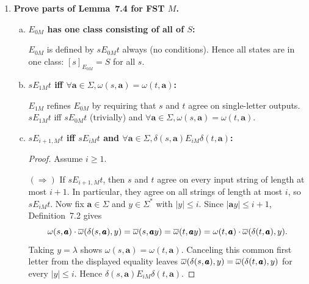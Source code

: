 \begin{enumerate}[{7.}1.]
\begin{enumerate}[(a)]
  \item \textbf{Part (e):} If $E_{mM}=E_{m+1,M}$, then $E_{mM}=E_M$.

  \begin{proof}
  By part~(b), $E_M\subseteq E_{mM}$.  For the reverse inclusion, let
  $s E_{mM} t$ and let $x\in\Sigma^*$ be arbitrary, say $|x|=k$.  By part~(c),
  \[
    E_{m+k,M}=E_{mM},
  \]
  so $s E_{m+k,M} t$.  By definition of $E_{m+k,M}$, the states $s$ and $t$
  agree on every input string of length at most $m+k$, and in particular on the
  string $x$.  Thus $\OBAR(s,x)=\OBAR(t,x)$.  Since $x$ was arbitrary, $s E_M t$.
  Hence $E_{mM}\subseteq E_M$, and therefore $E_{mM}=E_M$. \qed
  \end{proof}
\end{enumerate}

\item \textbf{Prove parts of Lemma~7.4 for FST $M$.}

\begin{enumerate}[(a)]
  \item \textbf{$E_{0M}$ has one class consisting of all of $S$:}

  $E_{0M}$ is defined by $s E_{0M} t$ always (no conditions).  Hence all states are in one class: $[s]_{E_{0M}}=S$ for all $s$.

  \item \textbf{$s E_{1M} t$ iff $\forall\pmb{a}\in\Sigma,\omega(s,\pmb{a})=\omega(t,\pmb{a})$:}

  $E_{1M}$ refines $E_{0M}$ by requiring that $s$ and $t$ agree on single-letter outputs.  $s E_{1M} t$ iff $s E_{0M} t$ (trivially) and $\forall\pmb{a}\in\Sigma,\omega(s,\pmb{a})=\omega(t,\pmb{a})$.

  \item \textbf{$s E_{i+1,M} t$ iff $s E_{iM} t$ and $\forall\pmb{a}\in\Sigma,\delta(s,\pmb{a}) E_{iM} \delta(t,\pmb{a})$:}

  \begin{proof}
  Assume $i\ge 1$.

  $(\Rightarrow)$ If $s E_{i+1,M} t$, then $s$ and $t$ agree on every input
  string of length at most $i+1$.  In particular, they agree on all strings of
  length at most $i$, so $s E_{iM} t$.  Now fix $\pmb{a}\in\Sigma$ and
  $y\in\Sigma^*$ with $|y|\le i$.  Since $|\pmb{a}y|\le i+1$, Definition~7.2
  gives
  \[
  \omega(s,\pmb{a})\cdot\overline{\omega}(\delta(s,\pmb{a}),y)
  =\overline{\omega}(s,\pmb{a}y)
  =\overline{\omega}(t,\pmb{a}y)
  =\omega(t,\pmb{a})\cdot\overline{\omega}(\delta(t,\pmb{a}),y).
  \]
  Taking $y=\lambda$ shows $\omega(s,\pmb{a})=\omega(t,\pmb{a})$.  Canceling
  this common first letter from the displayed equality leaves
  $\overline{\omega}(\delta(s,\pmb{a}),y)=\overline{\omega}(\delta(t,\pmb{a}),y)$ for every $|y|\le i$.
  Hence $\delta(s,\pmb{a}) E_{iM}\delta(t,\pmb{a})$.


\end{proof}
\end{enumerate}
\end{enumerate}
